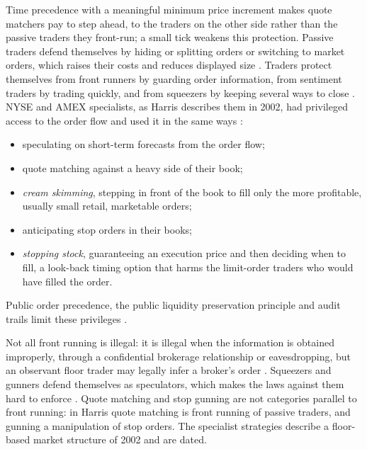 \begin{qfdefinition}
 Time precedence with a meaningful minimum price increment makes quote matchers pay to step ahead, to the traders on the other side rather than the passive traders they front-run; a small tick weakens this protection. Passive traders defend themselves by hiding or splitting orders or switching to market orders, which raises their costs and reduces displayed size \citep[same chap., pp.~250 and~257]{alpha-harris}. Traders protect themselves from front runners by guarding order information, from sentiment traders by trading quickly, and from squeezers by keeping several ways to close \citep[same chap., p.~257]{alpha-harris}. NYSE and AMEX specialists, as Harris describes them in 2002, had privileged access to the order flow and used it in the same ways \citep[chap.~``Specialists'', sec.~24.5, pp.~501--508]{alpha-harris}:
\begin{itemize}
\item speculating on short-term forecasts from the order flow;
\item quote matching against a heavy side of their book;
\item \emph{cream skimming}, stepping in front of the book to fill only the more profitable, usually small retail, marketable orders;
\item anticipating stop orders in their books;
\item \emph{stopping stock}, guaranteeing an execution price and then deciding when to fill, a look-back timing option that harms the limit-order traders who would have filled the order.
\end{itemize}
Public order precedence, the public liquidity preservation principle and audit trails limit these privileges \citep[sec.~24.2.2, pp.~498--499]{alpha-harris}.

 Not all front running is illegal: it is illegal when the information is obtained improperly, through a confidential brokerage relationship or eavesdropping, but an observant floor trader may legally infer a broker's order \citep[chap.~``Order Anticipators'', sec.~11.1.1, pp.~246--247]{alpha-harris}. Squeezers and gunners defend themselves as speculators, which makes the laws against them hard to enforce \citep[same chap., pp.~256--257]{alpha-harris}. Quote matching and stop gunning are not categories parallel to front running: in Harris quote matching is front running of passive traders, and gunning a manipulation of stop orders. The specialist strategies describe a floor-based market structure of 2002 and are dated.


\end{qfdefinition}
